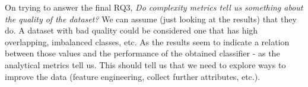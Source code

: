 On trying to answer the final RQ3, \textit{Do complexity metrics tell us 
something about the quality of the dataset?} We can assume 
(just looking at the results) that they do. A dataset with bad quality could be 
considered one that has high overlapping, imbalanced classes, etc. As the 
results seem to indicate a relation between those values and the performance of 
the obtained classifier - as the analytical metrics tell us. This should tell us 
that we need to explore ways to improve the data (feature engineering, collect 
further attributes, etc.).

\lhead{}




